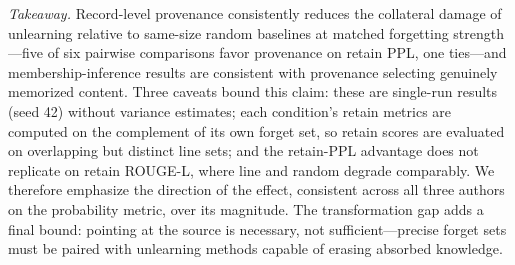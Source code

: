 \emph{Takeaway.} Record-level provenance consistently reduces the collateral damage of unlearning relative to same-size random baselines at matched forgetting strength---five of six pairwise comparisons favor provenance on retain PPL, one ties---and membership-inference results are consistent with provenance selecting genuinely memorized content. Three caveats bound this claim: these are single-run results (seed 42) without variance estimates; each condition's retain metrics are computed on the complement of its own forget set, so retain scores are evaluated on overlapping but distinct line sets; and the retain-PPL advantage does not replicate on retain ROUGE-L, where line and random degrade comparably. We therefore emphasize the direction of the effect, consistent across all three authors on the probability metric, over its magnitude. The transformation gap adds a final bound: pointing at the source is necessary, not sufficient---precise forget sets must be paired with unlearning methods capable of erasing absorbed knowledge.
